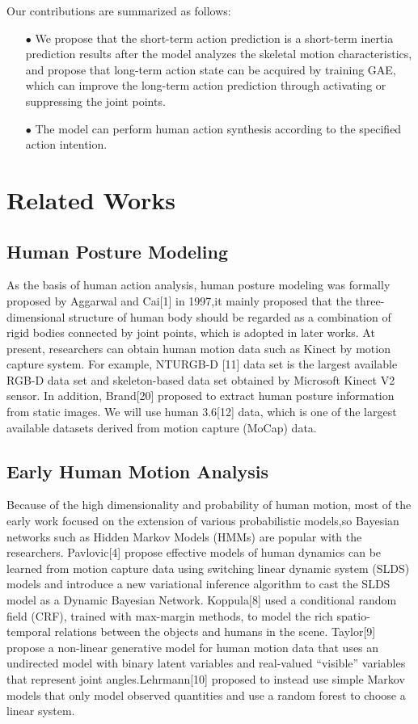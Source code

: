 \documentclass[conference]{IEEEtran}
\begin{document}
Our contributions are summarized as follows: 
\begin{itemize}
\item[$\bullet$] We propose that the short-term action prediction is a short-term inertia prediction results after the model analyzes the skeletal motion characteristics, and propose that long-term action state can be acquired by training GAE, which can improve the long-term action prediction through activating or suppressing the joint points.\\
\item[$\bullet$]  The model can perform human action synthesis according to the specified action intention.\\
\end{itemize}

\section{Related Works}
\subsection{Human Posture Modeling}
As the basis of human action analysis, human posture modeling was formally proposed by Aggarwal and Cai[1] in 1997,it mainly proposed that the three-dimensional structure of human body should be regarded as a combination of rigid bodies connected by joint points, which is adopted in later works. At present, researchers can obtain human motion data such as Kinect by motion capture system. For example, NTURGB-D [11] data set is the largest available RGB-D data set and skeleton-based data set obtained by Microsoft Kinect V2 sensor. In addition, Brand[20] proposed to extract human posture information from static images. We will use human 3.6[12] data, which is one of the largest available datasets derived from motion capture (MoCap) data.
\subsection{Early Human Motion Analysis}
Because of the high dimensionality and probability of human motion, most of the early work focused on the extension of various probabilistic models,so Bayesian networks such as Hidden Markov Models (HMMs) are popular with the researchers. Pavlovic[4] propose effective models of human dynamics can be learned from motion capture data using switching linear dynamic system (SLDS) models and introduce a new variational inference algorithm to cast the SLDS model as a Dynamic Bayesian Network. Koppula[8] used a conditional random field (CRF), trained with max-margin methods, to model the rich spatio-temporal relations between the objects and humans in the scene. Taylor[9] propose a non-linear generative model for human motion data that uses an undirected model with binary latent variables and real-valued “visible” variables that represent joint angles.Lehrmann[10] proposed to instead use simple Markov models that only model observed quantities and use a random forest to choose a linear system.
\end{document}
